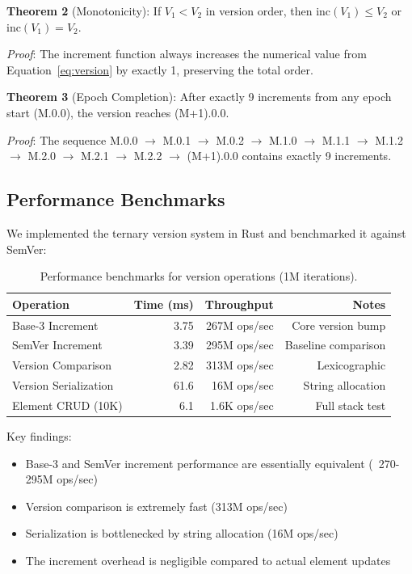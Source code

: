 \documentclass{article}
\begin{document}
\textbf{Theorem 2} (Monotonicity): If $V_1 < V_2$ in version order, then $\text{inc}(V_1) \leq V_2$ or $\text{inc}(V_1) = V_2$.

\textit{Proof}: The increment function always increases the numerical value from Equation~\ref{eq:version} by exactly 1, preserving the total order.

\textbf{Theorem 3} (Epoch Completion): After exactly 9 increments from any epoch start (M.0.0), the version reaches (M+1).0.0.

\textit{Proof}: The sequence M.0.0 $\to$ M.0.1 $\to$ M.0.2 $\to$ M.1.0 $\to$ M.1.1 $\to$ M.1.2 $\to$ M.2.0 $\to$ M.2.1 $\to$ M.2.2 $\to$ (M+1).0.0 contains exactly 9 increments.

\subsection{Performance Benchmarks}

We implemented the ternary version system in Rust and benchmarked it against SemVer:

\begin{table}[h]
\centering
\caption{Performance benchmarks for version operations (1M iterations).}
\label{tab:benchmark}
\begin{tabular}{lrrr}
\toprule
\textbf{Operation} & \textbf{Time (ms)} & \textbf{Throughput} & \textbf{Notes} \\
\midrule
Base-3 Increment & 3.75 & 267M ops/sec & Core version bump \\
SemVer Increment & 3.39 & 295M ops/sec & Baseline comparison \\
Version Comparison & 2.82 & 313M ops/sec & Lexicographic \\
Version Serialization & 61.6 & 16M ops/sec & String allocation \\
Element CRUD (10K) & 6.1 & 1.6K ops/sec & Full stack test \\
\bottomrule
\end{tabular}
\end{table}

Key findings:
\begin{itemize}
\item Base-3 and SemVer increment performance are essentially equivalent (~270-295M ops/sec)
\item Version comparison is extremely fast (313M ops/sec)
\item Serialization is bottlenecked by string allocation (16M ops/sec)
\item The increment overhead is negligible compared to actual element updates
\end{itemize}
\end{document}
